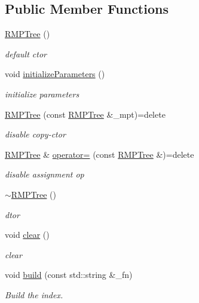 \subsection*{Public Member Functions}
\begin{DoxyCompactItemize}
\item 
\hyperlink{classRMPTree_aa40e0de7051ee571a9d89cd9106e0c62}{R\-M\-P\-Tree} ()
\begin{DoxyCompactList}\small\item\em default ctor \end{DoxyCompactList}\item 
void \hyperlink{classRMPTree_a398eb082ee35f45e8e2e119478c3c7aa}{initialize\-Parameters} ()
\begin{DoxyCompactList}\small\item\em initialize parameters \end{DoxyCompactList}\item 
\hyperlink{classRMPTree_a77c366d17bf6c7082188d45b0a9e967a}{R\-M\-P\-Tree} (const \hyperlink{classRMPTree}{R\-M\-P\-Tree} \&\-\_\-mpt)=delete
\begin{DoxyCompactList}\small\item\em disable copy-\/ctor \end{DoxyCompactList}\item 
\hyperlink{classRMPTree}{R\-M\-P\-Tree} \& \hyperlink{classRMPTree_ae16ed3a2d18e52997dfaff4870f2372d}{operator=} (const \hyperlink{classRMPTree}{R\-M\-P\-Tree} \&)=delete
\begin{DoxyCompactList}\small\item\em disable assignment op \end{DoxyCompactList}\item 
\hyperlink{classRMPTree_ac23a18d501f8c430a9c313e5a11f5017}{$\sim$\-R\-M\-P\-Tree} ()
\begin{DoxyCompactList}\small\item\em dtor \end{DoxyCompactList}\item 
void \hyperlink{classRMPTree_acdc7500f870bdf78aee90553dff1fb83}{clear} ()
\begin{DoxyCompactList}\small\item\em clear \end{DoxyCompactList}\item 
void \hyperlink{classRMPTree_a2a178a47b5eb15869548e79cc13dee8f}{build} (const std\-::string \&\-\_\-fn)
\begin{DoxyCompactList}\small\item\em Build the index. \end{DoxyCompactList}\item 

\end{DoxyCompactItemize}
